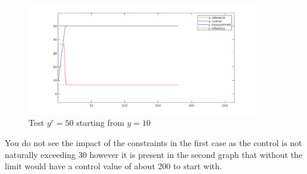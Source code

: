 \documentclass{article}
\begin{document}
\begin{figure}[H]
    \centering
    \includegraphics[width=0.9\textwidth]{mpc_modified_model_hH_ss.jpg}
    \caption{Test $y^r = 50$ starting from $y=10$}
    \label{fig:yr50}
\end{figure}

You do not see the impact of the constraints in the first case as the control is not naturally exceeding 30 however it is present in the second graph that without the limit would have a control value of about 200 to start with.
\end{document}
